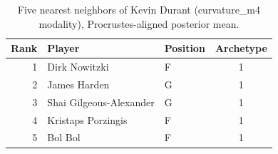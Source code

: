 \begin{table}[htbp]
  \centering\small
  \begin{tabular}{rllc}
    \toprule
    Rank & Player & Position & Archetype \\
    \midrule
    1 & Dirk Nowitzki & F & 1 \\
    2 & James Harden & G & 1 \\
    3 & Shai Gilgeous-Alexander & G & 1 \\
    4 & Kristaps Porzingis & F & 1 \\
    5 & Bol Bol & F & 1 \\
    \bottomrule
  \end{tabular}
  \caption{Five nearest neighbors of Kevin Durant (curvature_m4 modality), Procrustes-aligned posterior mean.}
  \label{tab:Kevin_Durant_neighbors_curvature_m4}
\end{table}

